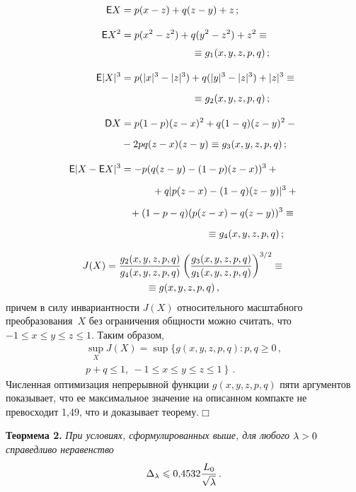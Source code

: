 \begin{multicols}{2}
\noindent
\begin{align*}
\e X&= p(x-z)+q(z-y)+z\,;
\\[9pt]
\e X^2&=p(x^2-z^2)+q(y^2-z^2)+z^2\equiv{}\\[3pt]
&\hspace*{25mm}{}\equiv g_1(x,y,z,p,q)\,;
\\[9pt]
\e|X|^3&= p(|x|^3-|z|^3)+q(|y|^3-|z|^3)+|z|^3\equiv{}\\[6pt]
&\hspace*{25mm} {}\equiv g_2(x,y,z,p,q)\,;\\[9pt]
\D X&=p(1-p)(z-x)^2+q(1-q)(z-y)^2-{}\\[6pt]
&{}-2pq(z-x)(z-y)\equiv g_3(x,y,z,p,q)\,;
\\[9pt]
\e|X-\e X|^3&=-p(q(z-y)-(1-p)(z-x))^3+{}\\[6pt]
&\hspace*{11mm}{}+q|p(z-x)-(1-q)(z-y)|^3+{}
\\[6pt]
&\hspace*{3mm}{}+ (1-p-q)(p(z-x)-q(z-y))^3\equiv{}\\[6pt]
&\hspace*{30mm}{}\equiv g_4(x,y,z,p,q)\,;
\end{align*}

\vspace*{-9pt}

\noindent
\begin{multline*}
J(X)=\displaystyle\frac{\displaystyle g_2(x,y,z,p,q)\mathstrut}{\displaystyle g_4(x,y,z,p,q)\mathstrut}
\left(\displaystyle\frac{\displaystyle g_3(x,y,z,p,q)\mathstrut}{\displaystyle g_1(x,y,z,p,q)\mathstrut}\right)^{3/2}\equiv{}\\
\equiv g(x,y,z,p,q)\,,
\end{multline*}
причем в силу инвариантности $J(X)$ относительного масштабного
преобразования~$X$ без ограничения общности можно считать, что $-1\leqslant
x\leqslant y\leqslant z\leqslant 1$. Таким образом,
\begin{multline*}
\sup\limits_{X}J(X)=\sup\left.\{g(x,y,z,p,q)\colon p,q\geqslant0\,,\right.\\
\left.p+q\leqslant1,\ -1\leqslant x\leqslant
y\leqslant z\leqslant 1 \right\}\,.
\end{multline*}
Численная оптимизация непрерывной функции $g(x,y,z,p,q)$ пяти
аргументов показывает, что ее максимальное значение на описанном
компакте не превосходит 1,49, что и доказывает теорему.\hfill$\Box$


\bigskip
\bigskip

\noindent
\textbf{Теормема 2.}
\textit{При условиях, сформулированных выше, для любого $\lambda>0$
справедливо неравенство}
\begin{equation}
\Delta_\lambda\leqslant 0{,}4532 \displaystyle\frac{\displaystyle L_0\mathstrut}{\displaystyle \sqrt{\lambda}\mathstrut}\,.
\end{equation}


\end{multicols}
